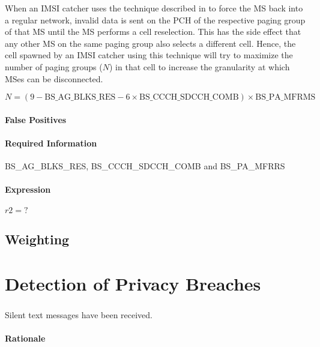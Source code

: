 \documentclass[a4paper,11pt,notitlepage,bigheadings,oneside]{scrartcl}
\begin{document}
When an IMSI catcher uses the technique described in
\cite[0021]{bott2000verfahren} to force the MS back into a regular network,
invalid data is sent on the PCH of the respective paging group of that MS until
the MS performs a cell reselection. This has the side effect that any other MS
on the same paging group also selects a different cell. Hence, the cell spawned
by an IMSI catcher using this technique will try to maximize the number of
paging groups ($N$) in that cell to increase the granularity at which MSes can
be disconnected.

${N} = (9 - {\text{BS\_AG\_BLKS\_RES}} - 6\times {\text{BS\_CCCH\_SDCCH\_COMB}})\times {\text{BS\_PA\_MFRMS}}$

\paragraph{False Positives}


\paragraph{Required Information}

BS\_AG\_BLKS\_RES, BS\_CCCH\_SDCCH\_COMB and BS\_PA\_MFRRS


\paragraph{Expression}

$r2 = ?$

\subsection{Weighting}

\section{Detection of Privacy Breaches}
\label{sec:detection_of_privacy_breaches}

\subsubsection{}

Silent text messages have been received.

\paragraph{Rationale}
\end{document}
